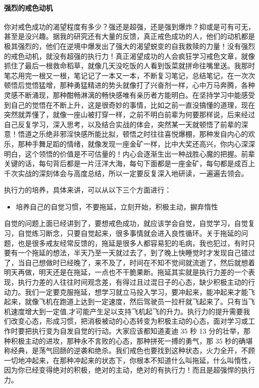 \paragraph{强烈的戒色动机}

你对戒色成功的渴望程度有多少？强还是超强，还是强到爆炸？抑或是可有可无，甚至是没兴趣。据我的研究还有大量的反馈，真正戒色成功的人，他们的动机都是极其强烈的，他们在逆境中爆发出了强大的渴望蜕变的自我救赎的力量！没有强烈的戒色动机，就没有超强的执行力！真正渴望成功的人会疯狂学习戒色文章，就像抓住了最后一根救命稻草，就像几天没吃饭的人看到饭菜就拼命往嘴里送。我那时笔芯用完一根又一根，笔记记了一本又一本，不断复习笔记，总结笔记，在一次次顿悟后觉悟猛增，那种勇猛精进的势头就像打了兴奋剂一样，心中万马奔腾，各种灵感不断涌现，那种酣畅淋漓的畅快感唯有亲历者方能明白。在坚持学习中能感受到自己的觉悟在不断上升，这是很奇妙的事情，比如之前一直没搞懂的道理，现在突然就弄懂了，就像一座山被打穿一样，之前不明白前辈为何要那样说，后来经过自己反复学习，深入思考，以及结合实战的体会，突然某一天就顿悟了前辈的深意！悟道之乐绝非邪淫快感所能比拟，顿悟之时往往喜悦爆棚，那种发自内心的欢乐，那种手舞足蹈的情绪，就像发现一座金矿一样，比中大奖还高兴，你内心深深明白，这个领悟的价值是不可估量的！内心会逐渐生出一种战胜心魔的把握。前辈关键的话，每句背后都是一片汪洋大海，每句下面都是一座金矿，每句都是成百上千次实战的深刻体会与高度总结，所以一定要反复深入地研读，一遍遍去领会。

执行力的培养，具体来讲，可以从以下三个方面进行：

\begin{itemize}
    \item 培养自己的自觉习惯，不要拖延，立刻开始，积极主动，摒弃惰性
\end{itemize}

自觉的问题上面已经讲到了，要想戒色成功，就应该学会自觉，自觉学习，自觉复习，自觉练习断念，只要自觉起来，很多事情就会进入良性循环。关于拖延的问题，也是很多戒友经常反馈的，拖延是很多人都容易犯的毛病，我也犯过，有时只要有一个拖延的想法，半天乃至一天就过去了，到了晚上快睡觉时才发现自己错过了，当自己想做时已经晚了，来不及了，时间在不知不觉间就流逝了，然后就想着明天再做，明天还是在拖延，一点也不干脆果断。拖延其实就是执行力差的一个表现，执行力差的人往往时间观念差，有得过且过混日子的心态，缺少积极主动的行动力。我们一定要克服拖延，想学习就立马投入学习，要冲起来，能冲起来才能飞起来，就像飞机在跑道上达到一定速度，然后驾驶员一拉杆就飞起来了。只有当飞机速度增大到一定值,才可能产生足以支持飞机起飞的升力。执行力的提升需要我们改变心态，形成习惯，把消极被动的心态转变为积极主动的心态，面对学习或工作时要把执行变为自发自觉的行动。大家应该都知道麦迪 35 秒 13 分的壮举，那种积极主动的进攻，那种永不言败的心态，那种拼死一搏的勇气，那 35 秒的确堪称经典，是荡气回肠的逆袭和绝杀。我们戒色也要找到这种状态，火力全开，不顾一切地冲起来，在那种冲起来的状态下，你根本不知道什么叫拖延，什么叫惰性，因为你已经变得绝对的积极，绝对的主动，绝对的有执行力！而且是超强悍的执行力。

